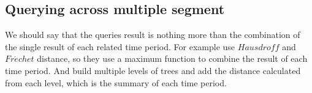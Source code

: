 \documentclass[sigplan]{acmart}
\begin{document}
\subsection{Querying across multiple segment}
We should say that the queries result is nothing more than the combination of the single result of each related time period. For example \cite{xie2017distributed} use $Hausdroff$ and $Fr\acute{e}chet$ distance, so they use a maximum function to combine the result of each time period. And \cite{shang2018dita} build multiple levels of trees and add the distance calculated from each level, which is the summary of each time period.\par
\end{document}
